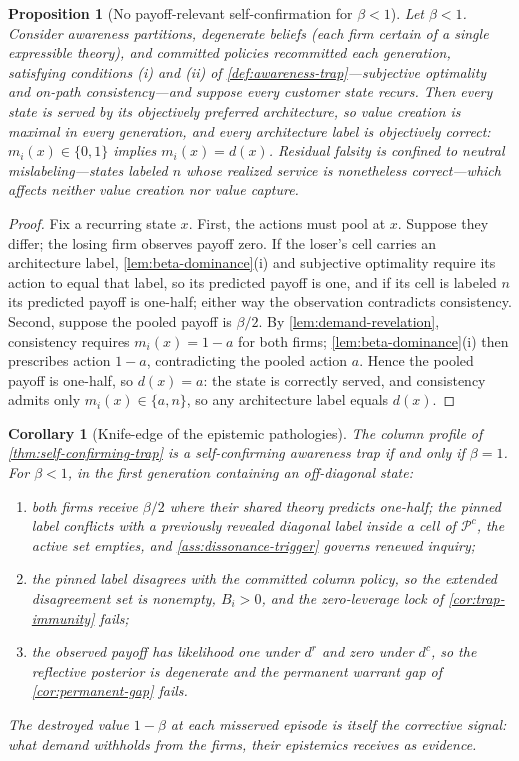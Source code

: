 \documentclass[11pt]{article}
\newtheorem{proposition}[assumption]{Proposition}
\newtheorem{corollary}[assumption]{Corollary}
\newcommand{\Pcol}{\mathcal P^{c}}
\begin{document}
\begin{proposition}[No payoff-relevant self-confirmation for $\beta<1$]
\label{prop:no-trap}
Let $\beta<1$.  Consider awareness partitions, degenerate beliefs (each firm
certain of a single expressible theory), and committed policies recommitted
each generation, satisfying conditions (i) and (ii) of
\cref{def:awareness-trap}---subjective optimality and on-path
consistency---and suppose every customer state recurs.  Then every state is
served by its objectively preferred architecture, so value creation is
maximal in every generation, and every architecture label is objectively
correct: $m_i(x)\in\{0,1\}$ implies $m_i(x)=d(x)$.  Residual falsity is
confined to neutral mislabeling---states labeled $n$ whose realized service is
nonetheless correct---which affects neither value creation nor value capture.
\end{proposition}

\begin{proof}
Fix a recurring state $x$.  First, the actions must pool at $x$.  Suppose they
differ; the losing firm observes payoff zero.  If the loser's cell carries an
architecture label, \cref{lem:beta-dominance}(i) and subjective optimality
require its action to equal that label, so its predicted payoff is one, and if
its cell is labeled $n$ its predicted payoff is one-half; either way the
observation contradicts consistency.  Second, suppose the pooled payoff is
$\beta/2$.  By \cref{lem:demand-revelation}, consistency requires
$m_i(x)=1-a$ for both firms; \cref{lem:beta-dominance}(i) then prescribes
action $1-a$, contradicting the pooled action $a$.  Hence the pooled payoff is
one-half, so $d(x)=a$: the state is correctly served, and consistency admits
only $m_i(x)\in\{a,n\}$, so any architecture label equals $d(x)$.
\end{proof}

\begin{corollary}[Knife-edge of the epistemic pathologies]
\label{cor:knife-edge}
The column profile of \cref{thm:self-confirming-trap} is a self-confirming
awareness trap if and only if $\beta=1$.  For $\beta<1$, in the first
generation containing an off-diagonal state:
\begin{enumerate}[label=(\roman*)]
  \item both firms receive $\beta/2$ where their shared theory predicts
  one-half; the pinned label conflicts with a previously revealed diagonal
  label inside a cell of $\Pcol$, the active set empties, and
  \cref{ass:dissonance-trigger} governs renewed inquiry;
  \item the pinned label disagrees with the committed column policy, so the
  extended disagreement set is nonempty, $B_i>0$, and the zero-leverage lock
  of \cref{cor:trap-immunity} fails;
  \item the observed payoff has likelihood one under $d^r$ and zero under
  $d^c$, so the reflective posterior is degenerate and the permanent warrant
  gap of \cref{cor:permanent-gap} fails.
\end{enumerate}
The destroyed value $1-\beta$ at each misserved episode is itself the
corrective signal: what demand withholds from the firms, their epistemics
receives as evidence.
\end{corollary}
\end{document}
